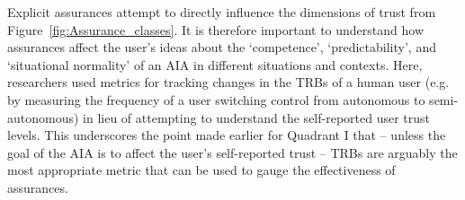 
Explicit assurances attempt to directly influence the dimensions of trust from Figure~\ref{fig:Assurance_classes}. 
It is therefore important to understand how assurances affect the user's ideas about the `competence', `predictability', and `situational normality' of an AIA in different situations and contexts. 
Here, researchers used metrics for tracking changes in the TRBs of a human user (e.g. by measuring the frequency of a user switching control from autonomous to semi-autonomous) in lieu of attempting to understand the self-reported user trust levels. 
This underscores the point made earlier for Quadrant I that -- unless the goal of the AIA is to affect the user's self-reported trust -- TRBs are arguably the most appropriate metric that can be used to gauge the effectiveness of assurances. %
